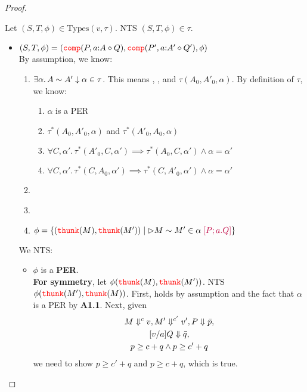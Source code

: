 \begin{proof}
\begin{enumerate}
Let $(S,T,\phi) \in \text{Types}(v,\tau)$. NTS $(S,T,\phi) \in \tau$.
\begin{itemize}
  \item $(S,T,\phi) = ({\color{red}{\mathtt{comp}}}(P, a {:} A \diamond Q), {\color{red}{\mathtt{comp}}}(P', a {:} A' \diamond Q'), \phi)$\\
  By assumption, we know:
    \begin{enumerate}[label=\textbf{\Alph*)}]
     \item $\exists \alpha.\, A \sim A' \downarrow \alpha \in \tau$. This means 
  , , and $\tau(A_0,A'_0,\alpha)$. By definition of $\tau$, we know: 
  \begin{enumerate}[label=\textbf{A1.\arabic*}]
    \item $\alpha$ is a PER 
    \item $\tau^*(A_0,A'_0,\alpha)$ and $\tau^*(A'_0,A_0,\alpha)$ \label{fact:alphaper}
    \item $\forall C,\alpha'.\, \tau^*(A'_0,C,\alpha') \implies \tau^*(A_0,C,\alpha') \land \alpha = \alpha'$ \label{fact:propA}
    \item $\forall C,\alpha'.\, \tau^*(C,A_0,\alpha') \implies \tau^*(C,A'_0,\alpha') \land \alpha = \alpha'$
   \end{enumerate}
     \item {} \label{fact:peq}
     \item {} \label{fact:qeq}
     \item $\phi = \{({\color{red}{\mathtt{thunk}}}(M), {\color{red}{\mathtt{thunk}}}(M')) \mid
        \rhd M \sim M' \in \alpha\; {\color{purple}{[P; a.Q]}} \}$
    \end{enumerate}
    We NTS:
    \begin{itemize}
      \item $\phi$ is a \textbf{PER}.\\
        \textbf{For symmetry}, let $\phi({\color{red}{\mathtt{thunk}}}(M), {\color{red}{\mathtt{thunk}}}(M'))$. 
        NTS $\phi({\color{red}{\mathtt{thunk}}}(M'), {\color{red}{\mathtt{thunk}}}(M))$. 
        First,  holds by assumption and the fact that 
        $\alpha$ is a PER by \textbf{A1.1}. Next, given 
        \begin{gather*}
          \evalCost{M}{c}{v}, \evalCost{M'}{c'}{v'}, \eval{P}{\bar{p}},\\
          \eval{[v/a]Q}{\bar{q}},\\
          p \ge c + q \land p \ge c' + q 
        \end{gather*}
        we need to show $p \ge c'  + q$ and $p \ge c + q$, which is true.


\end{itemize}
\end{itemize}
\end{enumerate}
\end{proof}
